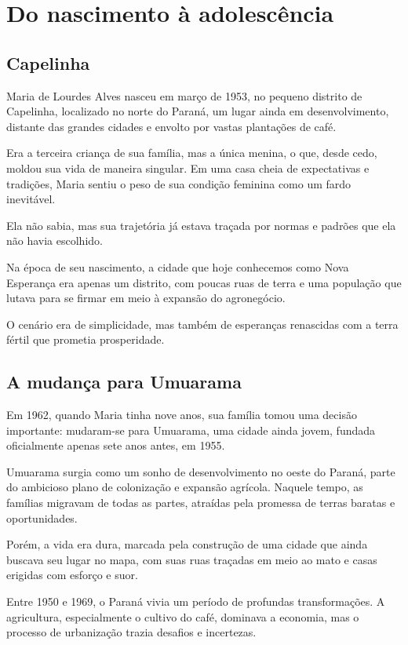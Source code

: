 \temaMaria
\chapter*{Do nascimento à adolescência}

\section*{Capelinha}

Maria de Lourdes Alves nasceu em março de 1953, no pequeno distrito de Capelinha, localizado no norte do Paraná, um lugar ainda em desenvolvimento, distante das grandes cidades e envolto por vastas plantações de café.

Era a terceira criança de sua família, mas a única menina, o que, desde cedo, moldou sua vida de maneira singular. Em uma casa cheia de expectativas e tradições, Maria sentiu o peso de sua condição feminina como um fardo inevitável.

Ela não sabia, mas sua trajetória já estava traçada por normas e padrões que ela não havia escolhido.

Na época de seu nascimento, a cidade que hoje conhecemos como Nova Esperança era apenas um distrito, com poucas ruas de terra e uma população que lutava para se firmar em meio à expansão do agronegócio.

O cenário era de simplicidade, mas também de esperanças renascidas com a terra fértil que prometia prosperidade.

\section*{A mudança para Umuarama}

Em 1962, quando Maria tinha nove anos, sua família tomou uma decisão importante: mudaram-se para Umuarama, uma cidade ainda jovem, fundada oficialmente apenas sete anos antes, em 1955.

Umuarama surgia como um sonho de desenvolvimento no oeste do Paraná, parte do ambicioso plano de colonização e expansão agrícola. Naquele tempo, as famílias migravam de todas as partes, atraídas pela promessa de terras baratas e oportunidades.

Porém, a vida era dura, marcada pela construção de uma cidade que ainda buscava seu lugar no mapa, com suas ruas traçadas em meio ao mato e casas erigidas com esforço e suor.

Entre 1950 e 1969, o Paraná vivia um período de profundas transformações. A agricultura, especialmente o cultivo do café, dominava a economia, mas o processo de urbanização trazia desafios e incertezas.

